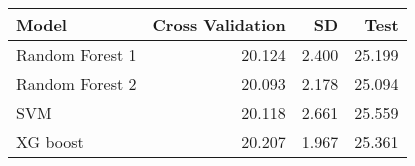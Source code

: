 \begin{tabular}{lrrr}
\toprule
Model & Cross Validation & SD & Test \\
\midrule
Random Forest 1 & 20.124 & 2.400 & 25.199 \\
Random Forest 2 & 20.093 & 2.178 & 25.094 \\
SVM & 20.118 & 2.661 & 25.559 \\
XG boost & 20.207 & 1.967 & 25.361 \\
\bottomrule
\end{tabular}
